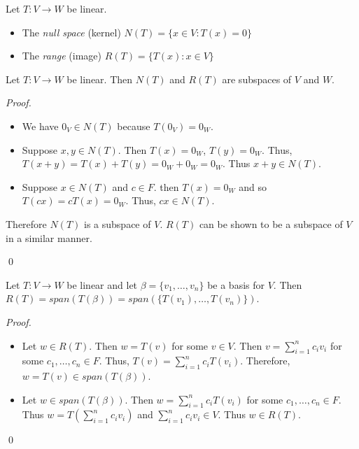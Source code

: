 \documentclass[12pt]{article}
\newenvironment{theorem}[2][Theorem]{\begin{trivlist}
\item[\hskip \labelsep {\bfseries #1}\hskip \labelsep {\bfseries #2.}]}{\end{trivlist}}
\newenvironment{definition}[2][Definition]{\begin{trivlist}
\item[\hskip \labelsep {\bfseries #1}\hskip \labelsep {\bfseries #2}]}{\end{trivlist}}
\newenvironment{sol}
    {\emph{Proof.}
    }
    {
    \qed
    }
\begin{document}
\begin{definition}{2}
Let $T : V \to W$ be linear.

\begin{itemize}
    \item The \textit{null space} (kernel) $N(T) = \{x \in V : T(x) = 0\}$
    \item The \textit{range} (image) $R(T) = \{T(x) : x \in V\}$
\end{itemize}
\end{definition}

\begin{theorem}{2.1}
Let $T : V \to W$ be linear. Then $N(T)$ and $R(T)$ are subspaces of $V$ and $W$.
\end{theorem}

\begin{sol}
\begin{itemize}
    \item[(1)] We have $0_V \in N(T)$ because $T(0_V) = 0_W$.
    
    \item[(2)] Suppose $x,y \in N(T)$. Then $T(x) = 0_W$, $T(y) = 0_W$. Thus, $T(x + y) = T(x) + T(y) = 0_W + 0_W = 0_W$. Thus $x + y \in N(T)$.
    
    \item[(3)] Suppose $x \in N(T)$ and $c \in F$. then $T(x) = 0_W$ and so $T(cx) = cT(x) = 0_W$. Thus, $cx \in N(T)$.
\end{itemize}

Therefore $N(T)$ is a subspace of $V$. $R(T)$ can be shown to be a subspace of $V$ in a similar manner.
\end{sol}

\begin{theorem}{2.2}
Let $T : V \to W$ be linear and let $\beta = \{v_1, \dots, v_n\}$ be a basis for $V$. Then $R(T) = span(T(\beta)) = span(\{T(v_1), \dots, T(v_n)\})$.
\end{theorem}

\begin{sol}
\begin{itemize}
    \item[(1)] Let $w \in R(T)$. Then $w = T(v)$ for some $v \in V$. Then $v = \sum_{i = 1}^n c_iv_i$ for some $c_1, \dots, c_n \in F$. Thus, $T(v) = \sum_{i = 1}^n c_iT(v_i)$. Therefore, $w = T(v) \in span(T(\beta))$.
    
    \item[(2)] Let $w \in span(T(\beta))$. Then $w = \sum_{i = 1}^nc_iT(v_i)$ for some $c_1, \dots, c_n \in F$. Thus $w = T \left( \sum_{i = 1}^nc_iv_i \right)$ and $\sum_{i = 1}^nc_iv_i \in V$. Thus $w \in R(T)$.
\end{itemize}
\end{sol}
\end{document}
